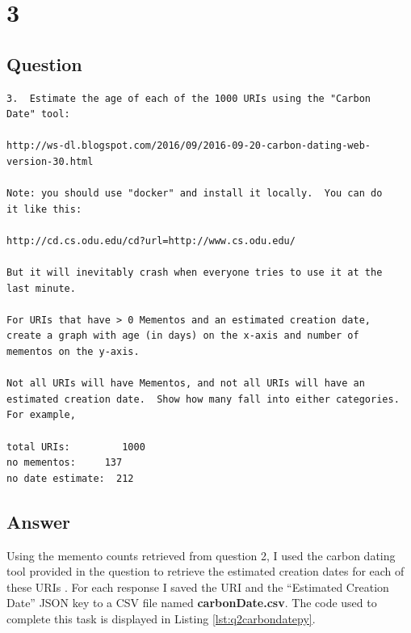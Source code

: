 \documentclass[letterpaper,11pt]{article}
\newcommand*{\srcPath}{../src}%
\begin{document}
\clearpage


\section*{3}

\subsection*{Question}

\begin{verbatim}
3.  Estimate the age of each of the 1000 URIs using the "Carbon
Date" tool:

http://ws-dl.blogspot.com/2016/09/2016-09-20-carbon-dating-web-version-30.html

Note: you should use "docker" and install it locally.  You can do
it like this:

http://cd.cs.odu.edu/cd?url=http://www.cs.odu.edu/

But it will inevitably crash when everyone tries to use it at the
last minute.

For URIs that have > 0 Mementos and an estimated creation date,
create a graph with age (in days) on the x-axis and number of
mementos on the y-axis.

Not all URIs will have Mementos, and not all URIs will have an
estimated creation date.  Show how many fall into either categories.
For example,

total URIs:         1000
no mementos:     137  
no date estimate:  212
\end{verbatim}

\clearpage
\subsection*{Answer}

Using the memento counts retrieved from question 2, I used the carbon dating tool provided in the question to retrieve the estimated creation dates for each of these URIs \cite{carbondateref}. For each response I saved the URI and the ``Estimated Creation Date'' JSON key to a CSV file named \textbf{carbonDate.csv}. The code used to complete this task is displayed in Listing \ref{lst:q2carbondatepy}. 


\end{document}
